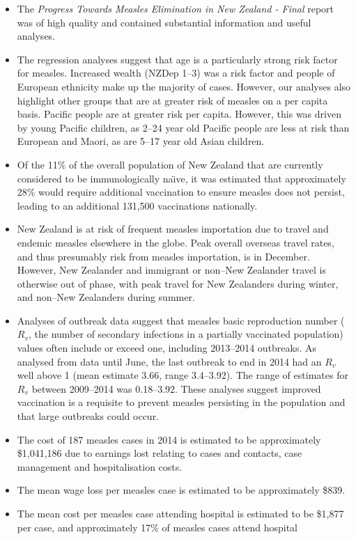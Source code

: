 \documentclass{article}
\begin{document}
\begin{itemize}
\item The \emph {Progress Towards Measles Elimination in New Zealand - Final} report was of high quality and contained substantial information and useful analyses.
\item The regression analyses suggest that age is a particularly strong risk factor for measles.  Increased wealth (NZDep 1--3) was a risk factor and people of European ethnicity make up the majority of cases. However, our analyses also highlight other groups that are at greater risk of measles on a per capita basis. Pacific people are at greater risk per capita. However, this was driven by young Pacific children, as 2--24 year old Pacific people are less at risk than European and Maori, as are 5--17 year old Asian children.
\item Of the 11\% of the overall population of New Zealand that are currently considered to be immunologically na\"{\i}ve, it was estimated that approximately 28\% would require additional vaccination to ensure measles does not persist, leading to an additional 131,500 vaccinations nationally.
\item New Zealand is at risk of frequent measles importation due to travel and endemic measles elsewhere in the globe. Peak overall overseas travel rates, and thus presumably risk from measles importation, is in December. However, New Zealander and immigrant or non--New Zealander travel is otherwise out of phase, with peak travel for New Zealanders during winter, and non--New Zealanders during summer.
\item Analyses of outbreak data suggest that measles basic reproduction number ($R_v$, the number of secondary infections in a partially vaccinated population) values often include or exceed one, including 2013--2014 outbreaks. As analysed from data until June, the last outbreak to end in 2014 had an $R_v$ well above 1 (mean estimate 3.66, range 3.4--3.92). The range of estimates for $R_v$ between 2009--2014 was 0.18--3.92. These analyses suggest improved vaccination is a requisite to prevent measles persisting in the population and that large outbreaks could occur.
\item The cost of 187 measles cases in 2014 is estimated to be approximately \$1,041,186 due to earnings lost relating to cases and contacts, case management and hospitalisation costs.
\item The mean wage loss per measles case is estimated to be approximately \$839.
\item The mean cost per measles case attending hospital is estimated to be \$1,877 per case, and approximately 17\% of measles cases attend hospital

\end{itemize}
\end{document}
